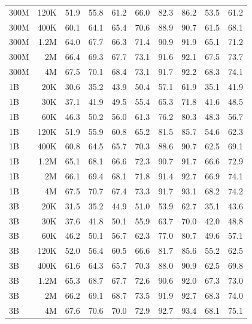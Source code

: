 \begin{table}[t]
\begin{tabulary}{1.0\textwidth}{l r c c c c c c c c}
300M  & 120K  & 51.9 & 55.8 & 61.2 & 66.0 & 82.3 & 86.2 & 53.5 & 61.2 \\
300M  & 400K  & 60.1 & 64.1 & 65.4 & 70.6 & 88.9 & 90.7 & 61.5 & 68.1 \\
300M  & 1.2M    & 64.0 & 67.7 & 66.3 & 71.4 & 90.9 & 91.9 & 65.1 & 71.2 \\
300M  & 2M    & 66.4 & 69.3 & 67.7 & 73.1 & 91.6 & 92.1 & 67.5 & 73.7 \\
300M  & 4M    & 67.5 & 70.1 & 68.4 & 73.1 & 91.7 & 92.2 & 68.3 & 74.1 \\
\midrule[0.25pt]
1B    & 20K   & 30.6 & 35.2 & 43.9 & 50.4 & 57.1 & 61.9 & 35.1 & 41.9 \\
1B    & 30K   & 37.1 & 41.9 & 49.5 & 55.4 & 65.3 & 71.8 & 41.6 & 48.5 \\
1B    & 60K   & 46.3 & 50.2 & 56.0 & 61.3 & 76.2 & 80.3 & 48.3 & 56.7 \\
1B    & 120K  & 51.9 & 55.9 & 60.8 & 65.2 & 81.5 & 85.7 & 54.6 & 62.3 \\
1B    & 400K  & 60.8 & 64.5 & 65.7 & 70.3 & 88.6 & 90.7 & 62.5 & 69.1 \\
1B    & 1.2M    & 65.1 & 68.1 & 66.6 & 72.3 & 90.7 & 91.7 & 66.6 & 72.9 \\
1B    & 2M    & 66.1 & 69.4 & 68.1 & 71.8 & 91.4 & 92.7 & 66.9 & 74.1 \\
1B    & 4M    & 67.5 & 70.7 & 67.4 & 73.3 & 91.7 & 93.1 & 68.2 & 74.2 \\
\midrule[0.25pt]
3B    & 20K   & 31.5 & 35.2 & 44.9 & 51.0 & 53.9 & 62.7 & 35.1 & 43.6 \\
3B    & 30K   & 37.6 & 41.8 & 50.1 & 55.9 & 63.7 & 70.0 & 42.0 & 48.8 \\
3B    & 60K   & 46.2 & 50.1 & 56.7 & 62.3 & 77.0 & 80.7 & 49.6 & 57.1 \\
3B    & 120K  & 52.0 & 56.4 & 60.5 & 66.6 & 81.7 & 85.6 & 55.2 & 62.5 \\
3B    & 400K  & 61.6 & 64.3 & 65.7 & 70.3 & 88.0 & 90.9 & 62.5 & 69.8 \\
3B    & 1.2M    & 65.3 & 68.7 & 67.7 & 72.6 & 90.6 & 92.0 & 67.3 & 73.0 \\
3B    & 2M    & 66.2 & 69.1 & 68.7 & 73.5 & 91.9 & 92.7 & 68.3 & 74.0 \\
3B    & 4M    & 67.6 & 70.6 & 70.0 & 72.9 & 92.7 & 93.4 & 68.1 & 75.1 \\
    \bottomrule
  \end{tabulary}
\end{table}


